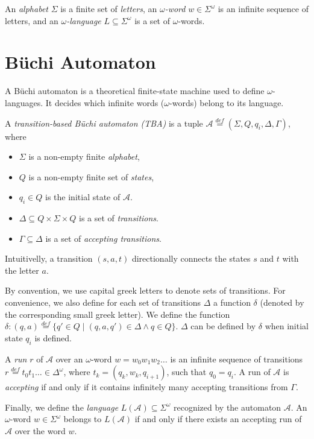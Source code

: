 \documentclass[
	digital,
nolof, nolot
]{fithesis3}
\newcommand{\cA}{\mathcal{A}}
\newcommand{\lA}{L(\cA)}
\newcommand{\eqdef}{\overset{def}{=}}
\begin{document}
		
		An \emph{alphabet} $\Sigma$  is a finite set of \emph{letters}, an \emph{$\omega$-word} $w \in \Sigma^\omega$ is an infinite sequence of letters, and an \emph{$\omega$-language} $L \subseteq \Sigma^\omega$ is a set of $\omega$-words.
		\section{Büchi Automaton} \label{section:tba}
			A Büchi automaton is a theoretical finite-state machine used to define $\omega$-languages. It decides which infinite words ($\omega$-words) belong to its language.
			
			A \emph{transition-based Büchi automaton (TBA)} is a tuple $\cA\eqdef(\Sigma, Q, q_i, \Delta, \Gamma)$, where 
			\begin{itemize}
				\item $\Sigma$ is a non-empty finite \emph{alphabet},
				\item $Q$ is a non-empty finite set of \emph{states},
				\item $q_i \in Q$ is the initial state of $\cA$.
				\item $\Delta \subseteq Q \times \Sigma \times Q$ is a set of \emph{transitions}. 
				\item $\Gamma \subseteq \Delta$ is a set of \emph{accepting transitions}.
			\end{itemize}
			 Intuitivelly, a transition $(s, a, t)$  directionally connects the states $s$ and $t$ with the letter $a$.
			 
			 By convention, we use capital greek letters to denote sets of transitions. For convenience, we also define for each set of transitions $\Delta$ a function $\delta$ (denoted by the corresponding small greek letter).  We define the function  	
			 $\delta\colon (q,a)\eqdef\{q'\in Q \mid  (q,a,q') \in \Delta \land q \in Q\}$. $\Delta$ can be defined by $\delta$ when initial state $q_i$ is defined.
			 
			A \emph{run} $r$ of $\cA$ over an $\omega$-word $w=w_0w_1w_2\ldots$ is an infinite sequence of transitions
			$r\eqdef t_0t_1\ldots\in\Delta^\omega$, where $t_k=(q_k, w_k,q_{i+1})$,
			 such that $q_0=q_i$.
			A run of $\cA$ is \emph{accepting} if and only if it contains infinitely many accepting transitions from $\Gamma$.

			Finally, we define the \emph{language} $\lA \subseteq \Sigma^\omega$ recognized by the automaton $\cA$. An $\omega$-word $w \in \Sigma^\omega$ belongs to $\lA$ if and only if there exists an accepting run of $\cA$ over the word $w$. 
			
\end{document}
